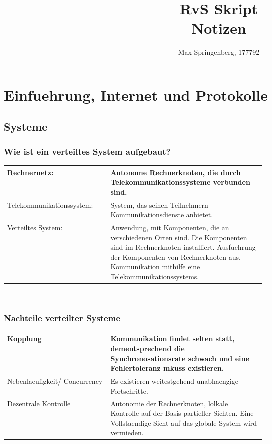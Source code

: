 \documentclass{article}
\author{Max Springenberg, 177792}
\title{
    RvS Skript\\
    Notizen
}
\date{}
\begin{document}
\maketitle
\newpage

\section{Einfuehrung, Internet und Protokolle}
\subsection{Systeme}
\subsubsection{Wie ist ein verteiltes System aufgebaut?}
\begin{tabular}{|lp{0.6\linewidth}|}
    \hline
    Rechnernetz: & 
        Autonome Rechnerknoten, die durch Telekommunikationssysteme verbunden sind.\\
    \hline
    Telekommunikationssystem: &
        System, das seinen Teilnehmern Kommunikationsdienste anbietet.\\
    \hline
    Verteiltes System: &
        Anwendung, mit Komponenten, die an verschiedenen Orten sind.
        Die Komponenten sind im Rechnerknoten installiert.
        Ausfuehrung der Komponenten von Rechnerknoten aus.
        Kommunikation mithilfe eine Telekommunikationssystems.\\
    \hline
\end{tabular}\\
\subsubsection{Nachteile verteilter Systeme}
\begin{tabular}{|lp{0.6\linewidth}|}
    \hline
    Kopplung &
        Kommunikation findet selten statt, dementsprechend die Synchronosationsrate schwach
        und eine Fehlertoleranz mkuss existieren.\\
    \hline
    Nebenlaeufigkeit/ Concurrency &
        Es existieren weitestgehend unabhaengige Fortschritte.\\
    \hline
    Dezentrale Kontrolle &
        Autonomie der Rechnerknoten, lolkale Kontrolle auf der Basis partieller Sichten.
        Eine Vollstaendige Sicht auf das globale System wird vermieden.\\
    \hline
\end{tabular}\\
\end{document}
